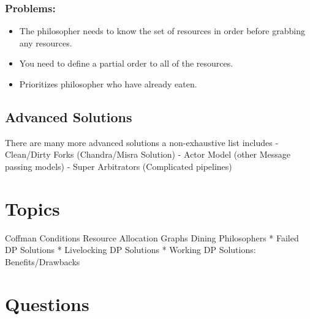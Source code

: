\subsubsection{Problems:}\label{problems-2}

\begin{itemize}
\tightlist
\item
  The philosopher needs to know the set of resources in order before
  grabbing any resources.
\item
  You need to define a partial order to all of the resources.
\item
  Prioritizes philosopher who have already eaten.
\end{itemize}

\subsection{Advanced Solutions}\label{advanced-solutions}

There are many more advanced solutions a non-exhaustive list includes -
Clean/Dirty Forks (Chandra/Misra Solution) - Actor Model (other Message
passing models) - Super Arbitrators (Complicated pipelines)

\section{Topics}\label{topics}

Coffman Conditions Resource Allocation Graphs Dining Philosophers *
Failed DP Solutions * Livelocking DP Solutions * Working DP Solutions:
Benefits/Drawbacks

\section{Questions}\label{questions}

